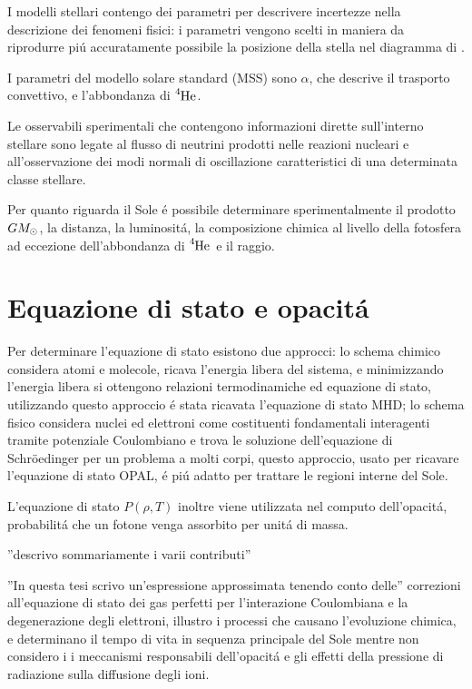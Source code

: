 \documentclass[../main.tex]{subfiles}
\begin{document}
I modelli stellari contengo dei parametri per descrivere incertezze nella descrizione dei fenomeni fisici: i parametri vengono scelti in maniera da riprodurre pi\'u accuratamente possibile la posizione della stella nel diagramma di \hr{}.

I parametri del modello solare standard (MSS) sono $\alpha$, che descrive il trasporto convettivo, e l'abbondanza di $\cel{He}{4}{}{}$.

Le osservabili sperimentali che contengono informazioni dirette sull'interno stellare sono legate al flusso di neutrini prodotti nelle reazioni nucleari e all'osservazione dei modi normali di oscillazione caratteristici di una determinata classe stellare.

Per quanto riguarda il Sole \'e possibile determinare sperimentalmente il prodotto $GM_{\odot}$, la distanza, la luminosit\'a, la composizione chimica al livello della fotosfera ad eccezione dell'abbondanza di $\cel{He}{4}{}{}$ e il raggio.

\begingroup
\color{midnightblue}

\section{Equazione di stato e opacit\'a}


Per determinare l'equazione di stato esistono due approcci: lo schema chimico considera atomi e molecole, ricava l'energia libera del sistema, e minimizzando l'energia libera si ottengono relazioni termodinamiche ed equazione di stato, utilizzando questo approccio \'e stata ricavata l'equazione di stato MHD; lo schema fisico considera nuclei ed elettroni come costituenti fondamentali interagenti tramite potenziale Coulombiano e trova le soluzione dell'equazione di Schr\"oedinger per un problema a molti corpi, questo approccio, usato per ricavare l'equazione di stato OPAL, \'e pi\'u adatto per trattare le regioni interne del Sole.

L'equazione di stato $P(\rho,T)$ inoltre viene utilizzata nel computo dell'opacit\'a, probabilit\'a che un fotone venga assorbito per unit\'a di massa.

''descrivo sommariamente i varii contributi''

''In questa tesi scrivo un'espressione approssimata tenendo conto delle'' correzioni all'equazione di stato dei gas perfetti per l'interazione Coulombiana e la degenerazione degli elettroni, illustro i processi che causano l'evoluzione chimica, e determinano il tempo di vita in sequenza principale del Sole mentre non considero i i meccanismi responsabili dell'opacit\'a e gli effetti della pressione di radiazione sulla diffusione degli ioni.
\end{document}
